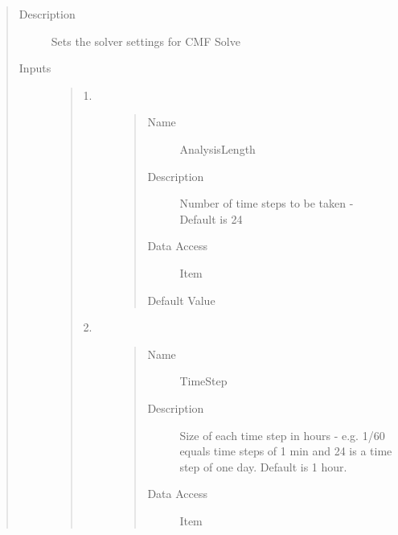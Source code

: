\documentclass[letterpaper,10pt,english]{sphinxmanual}
\begin{document}
\begin{quote}
\begin{description}
\begin{quote}
\begin{description}
\begin{quote}
\begin{description}
\end{description}\end{quote}

\end{description}\end{quote}

\end{description}\end{quote}

\begin{quote}\begin{description}
\item[{Description}] \leavevmode
Sets the solver settings for CMF Solve

\item[{Inputs}] \leavevmode\begin{quote}\begin{description}
\item[{1.}] \leavevmode\begin{quote}\begin{description}
\item[{Name}] \leavevmode
AnalysisLength

\item[{Description}] \leavevmode
Number of time steps to be taken - Default is 24

\item[{Data Access}] \leavevmode
Item

\item[{Default Value}] \leavevmode
{}

\end{description}\end{quote}

\item[{2.}] \leavevmode\begin{quote}\begin{description}
\item[{Name}] \leavevmode
TimeStep

\item[{Description}] \leavevmode
Size of each time step in hours - e.g. 1/60 equals time steps of 1 min and 24 is a time step
of one day. Default is 1 hour.

\item[{Data Access}] \leavevmode
Item


\end{description}
\end{quote}
\end{description}
\end{quote}
\end{description}
\end{quote}
\end{document}
